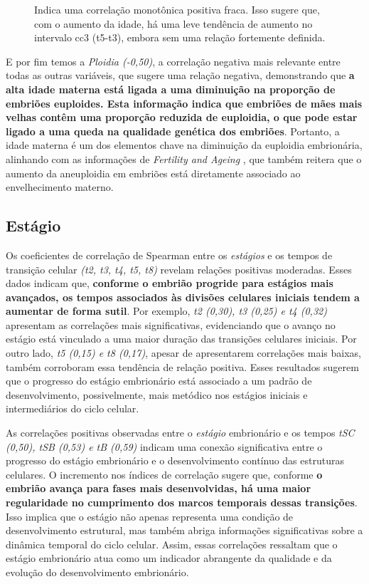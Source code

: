 \begin{figure}[h]
\begin{minipage}[b]{0.45\linewidth}
        \vspace{0.3cm}
        \caption{Indica uma correlação monotônica positiva fraca. Isso sugere que, com o aumento da idade, há uma leve tendência de aumento no intervalo cc3 (t5-t3), embora sem uma relação fortemente definida. }
        \begin{minipage}{\linewidth}
            \centering
        \end{minipage}
    \end{minipage}
\end{figure}
\FloatBarrier

E por fim temos a \textit{Ploidia (-0,50)}, a correlação negativa mais relevante entre todas as outras variáveis, que sugere uma relação negativa, demonstrando que \textbf{a alta idade materna está ligada a uma diminuição na proporção de embriões euploides. Esta informação indica que embriões de mães mais velhas contêm uma proporção reduzida de euploidia, o que pode estar ligado a uma queda na qualidade genética dos embriões}. Portanto, a idade materna é um dos elementos chave na diminuição da euploidia embrionária, alinhando com as informações de \textit{Fertility and Ageing} \cite{eshre2005}, que também reitera que o aumento da aneuploidia em embriões está diretamente associado ao envelhecimento materno.

\subsection*{Estágio}
Os coeficientes de correlação de Spearman entre os \textit{estágios} e os tempos de transição celular \textit{(t2, t3, t4, t5, t8)} revelam relações positivas moderadas. Esses dados indicam que, \textbf{conforme o embrião progride para estágios mais avançados, os tempos associados às divisões celulares iniciais tendem a aumentar de forma sutil}. Por exemplo, \textit{t2 (0,30), t3 (0,25) e t4 (0,32)} apresentam as correlações mais significativas, evidenciando que o avanço no estágio está vinculado a uma maior duração das transições celulares iniciais. Por outro lado, \textit{t5 (0,15) e t8 (0,17)}, apesar de apresentarem correlações mais baixas, também corroboram essa tendência de relação positiva. Esses resultados sugerem que o progresso do estágio embrionário está associado a um padrão de desenvolvimento, possivelmente, mais metódico nos estágios iniciais e intermediários do ciclo celular.

As correlações positivas observadas entre o \textit{estágio} embrionário e os tempos \textit{tSC (0,50), tSB (0,53) e tB (0,59)} indicam uma conexão significativa entre o progresso do estágio embrionário e o desenvolvimento contínuo das estruturas celulares. O incremento nos índices de correlação sugere que, conforme \textbf{o embrião avança para fases mais desenvolvidas, há uma maior regularidade no cumprimento dos marcos temporais dessas transições}. Isso implica que o estágio não apenas representa uma condição de desenvolvimento estrutural, mas também abriga informações significativas sobre a dinâmica temporal do ciclo celular. Assim, essas correlações ressaltam que o estágio embrionário atua como um indicador abrangente da qualidade e da evolução do desenvolvimento embrionário.

